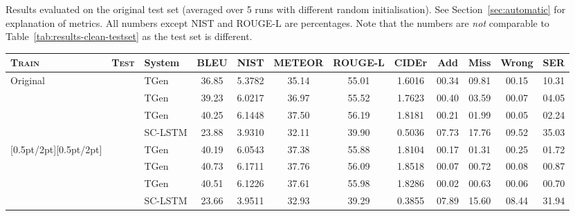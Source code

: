 \documentclass[11pt,a4paper]{article}
\newcommand\Tstrut{\rule{0pt}{2.3ex}}       \newcommand\Bstrut{\rule[-1.5ex]{0pt}{0pt}}
\begin{document}
\begin{table*}[tb]
\caption{Results evaluated on the original test set (averaged over 5 runs with different random initialisation). See Section~\ref{sec:automatic} for explanation of metrics. All numbers except NIST and ROUGE-L are percentages. Note that the numbers are \emph{not} comparable to Table~\ref{tab:results-clean-testset} as the test set is different.}
\label{tab:results}
\end{table*}


\begin{table*}[tb]
\footnotesize\centering
\begin{tabular}{lcl|ccccc|cccc}\hline
\bf \textsc{Train}          & \bf\textsc{Test}              
        & \bf System\hspace{3mm}              & \bf BLEU & \bf NIST & \bf \hspace{-2mm}METEOR\hspace{-2mm} & \bf \hspace{-1mm}ROUGE-L\hspace{-3mm} & \bf CIDEr & \bf Add & \bf Miss & \bf Wrong &\bf SER\Tstrut \\\hline
\multirow{4}{*}{Original} & \parbox[t]{2mm}{}
        & TGen  & 36.85 & 5.3782 & 35.14 & 55.01 & 1.6016 & 00.34 & 09.81 & 00.15 & 10.31\Tstrut  \\ &   & TGen     & 39.23 & 6.0217 & 36.97 & 55.52 & 1.7623 & 00.40 & 03.59 & 00.07 & 04.05  \\ &   & TGen  & 40.25 & 6.1448 & 37.50 & 56.19 & 1.8181 & 00.21 & 01.99 & 00.05 & 02.24  \\ &   & SC-LSTM  & 23.88 & 3.9310 & 32.11 & 39.90 & 0.5036 & 07.73 & 17.76 & 09.52 & 35.03 \\[0.5pt/2pt][0.5pt/2pt]
  & & TGen  & 40.19 & 6.0543 & 37.38 & 55.88 & 1.8104 & 00.17 & 01.31 & 00.25 & 01.72\Tstrut \\ &   & TGen     & 40.73 & 6.1711 & 37.76 & 56.09 & 1.8518 & 00.07 & 00.72 & 00.08 & 00.87  \\ &   & TGen  & 40.51 & 6.1226 & 37.61 & 55.98 & 1.8286 & 00.02 & 00.63 & 00.06 & 00.70  \\ &   & SC-LSTM  & 23.66 & 3.9511 & 32.93 & 39.29 & 0.3855 & 07.89 & 15.60 & 08.44 & 31.94 \\

\end{tabular}
\end{table*}
\end{document}
